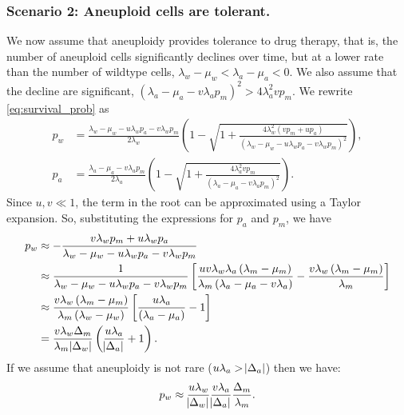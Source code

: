\documentclass[12pt]{extarticle}
\begin{document}
\begin{appendices}
\subsubsection*{Scenario 2: Aneuploid cells are tolerant.} 

We now assume that aneuploidy provides tolerance to drug therapy, that is, the number of aneuploid cells significantly declines over time, but at a lower rate than the number of wildtype cells, $\lambda_w - \mu_w < \lambda_a - \mu_a < 0$. We also assume that the decline are significant, $\left(\lambda_a-\mu_a-v\lambda_ap_m\right)^2 > 4\lambda_a^2 v p_m$.
We rewrite \cref{eq:survival_prob} as
\begin{equation}
\begin{aligned}
p_w&=\frac{\lambda_w-\mu_w-u\lambda_wp_a-v\lambda_wp_m}{2\lambda_w}\left(1-\sqrt{1+\frac{4\lambda_w^2\left(vp_m+up_a\right)}{\left(\lambda_w-\mu_w-u\lambda_wp_a-v\lambda_wp_m\right)^2}}\right), \\
p_a&=\frac{\lambda_a-\mu_a-v\lambda_ap_m}{2\lambda_a}\left(1-\sqrt{1+\frac{4\lambda_a^2vp_m}{\left(\lambda_a-\mu_a-v\lambda_ap_m\right)^2}}\right) .
\end{aligned}
\end{equation}
Since $u,v\ll1$, the term in the root can be approximated using a Taylor expansion. So, substituting the expressions for $p_a$ and $p_m$, we have
\begin{equation} \label{eq:survprobwinitial}
\begin{aligned}
p_w&\approx-\frac{v\lambda_wp_m+u\lambda_wp_a}{\lambda_w-\mu_w-u\lambda_wp_a-v\lambda_wp_m}\\
&\approx\frac{1}{\lambda_w-\mu_w-u\lambda_wp_a-v\lambda_wp_m}\left[\frac{uv\lambda_w\lambda_a\left(\lambda_m-\mu_m\right)}{\lambda_m\left(\lambda_a-\mu_a-v\lambda_a\right)}-\frac{v\lambda_w\left(\lambda_m-\mu_m\right)}{\lambda_m}\right]\\ 
&\approx\frac{v\lambda_w\left(\lambda_m-\mu_m\right)}{\lambda_m\left(\lambda_w-\mu_w\right)}\left[\frac{u\lambda_a}{\left(\lambda_a-\mu_a\right)}-1\right] \\
&=\frac{v\lambda_w\Delta_m}{\lambda_m \abs{\Delta_w}}\left(\frac{u\lambda_a}{\abs{\Delta_a}}+1\right) .
\end{aligned}
\end{equation}
If we assume that aneuploidy is not rare ($u\lambda_a>\abs{\Delta_a}$) then we have:
\begin{equation}\label{eq:pw_tolerant}
p_w\approx\frac{u\lambda_w}{\abs{\Delta_w}} \frac{v\lambda_a}{\abs{\Delta_a}} \frac{\Delta_m}{\lambda_m}.
\end{equation}


\end{appendices}
\end{document}
